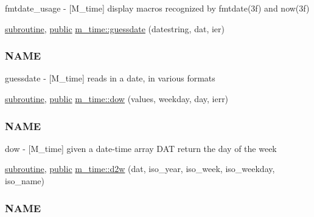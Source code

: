 \begin{DoxyCompactItemize}
\begin{DoxyCompactList}
fmtdate\+\_\+usage -\/ \mbox{[}M\+\_\+time\mbox{]} display macros recognized by fmtdate(3f) and now(3f) \end{DoxyCompactList}\item 
\hyperlink{M__stopwatch_83_8txt_acfbcff50169d691ff02d4a123ed70482}{subroutine}, \hyperlink{M__stopwatch_83_8txt_a2f74811300c361e53b430611a7d1769f}{public} \hyperlink{namespacem__time_aa5198c7aa4f3d8411c8ce93046ce3794}{m\+\_\+time\+::guessdate} (datestring, dat, ier)
\begin{DoxyCompactList}\small\item\em \subsubsection*{N\+A\+ME}

guessdate -\/ \mbox{[}M\+\_\+time\mbox{]} reads in a date, in various formats \end{DoxyCompactList}\item 
\hyperlink{M__stopwatch_83_8txt_acfbcff50169d691ff02d4a123ed70482}{subroutine}, \hyperlink{M__stopwatch_83_8txt_a2f74811300c361e53b430611a7d1769f}{public} \hyperlink{namespacem__time_adfda8a89820b8d0ad4581a14896e4ce5}{m\+\_\+time\+::dow} (values, weekday, day, ierr)
\begin{DoxyCompactList}\small\item\em \subsubsection*{N\+A\+ME}

dow -\/ \mbox{[}M\+\_\+time\mbox{]} given a date-\/time array D\+AT return the day of the week \end{DoxyCompactList}\item 
\hyperlink{M__stopwatch_83_8txt_acfbcff50169d691ff02d4a123ed70482}{subroutine}, \hyperlink{M__stopwatch_83_8txt_a2f74811300c361e53b430611a7d1769f}{public} \hyperlink{namespacem__time_ad4ff99ad6f6d5282c4b65ad636a2a627}{m\+\_\+time\+::d2w} (dat, iso\+\_\+year, iso\+\_\+week, iso\+\_\+weekday, iso\+\_\+name)
\begin{DoxyCompactList}\small\item\em \subsubsection*{N\+A\+ME}


\end{DoxyCompactList}
\end{DoxyCompactItemize}
